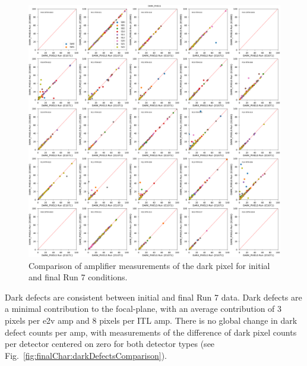 \begin{figure}[H]
    \centering
    \includegraphics[width=0.7\linewidth]{figures/finalCharacterization/E1880_E1071_DARK_PIXELS_inset.png}
    \caption{Comparison of amplifier measurements of the dark pixel for initial and final Run 7 conditions.}
    \label{fig:finalChar-DarkPix-5x5}
\end{figure}

Dark defects are consistent between initial and final Run 7 data. Dark defects are a minimal contribution to the focal-plane, with an average contribution of 3 pixels per e2v amp and 8 pixels per ITL amp. There is no global change in dark defect counts per amp, with measurements of the difference of 
dark pixel counts per detector centered on zero for both detector types (see Fig.~\ref{fig:finalChar:darkDefectsComparison}). 

